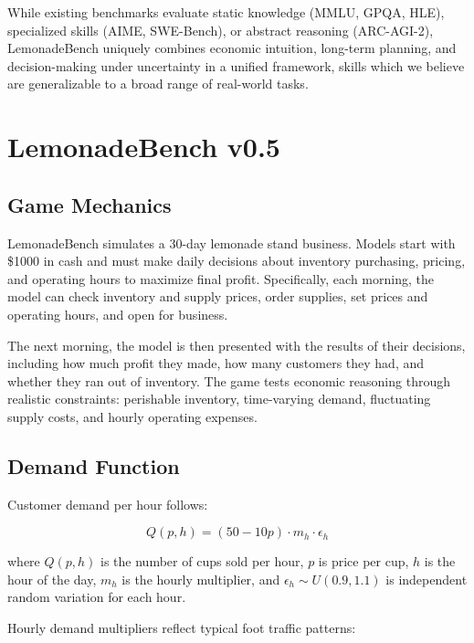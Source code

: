 \documentclass[11pt]{article}
\begin{document}
While existing benchmarks evaluate static knowledge (MMLU, GPQA, HLE), specialized skills (AIME, SWE-Bench), or abstract reasoning (ARC-AGI-2), LemonadeBench uniquely combines economic intuition, long-term planning, and decision-making under uncertainty in a unified framework, skills which we believe are generalizable to a broad range of real-world tasks.

\section{LemonadeBench v0.5}
\label{sec:lemonadebench}

\subsection{Game Mechanics}

LemonadeBench simulates a 30-day lemonade stand business.
Models start with \$1000 in cash and must make daily decisions about inventory purchasing, pricing, and operating hours to maximize final profit.
Specifically, each morning, the model can check inventory and supply prices, order supplies, set prices and operating hours, and open for business.

The next morning, the model is then presented with the results of their decisions, including how much profit they made, how many customers they had, and whether they ran out of inventory.
The game tests economic reasoning through realistic constraints: perishable inventory, time-varying demand, fluctuating supply costs, and hourly operating expenses.

\subsection{Demand Function}

Customer demand per hour follows:

\begin{equation}
Q(p, h) = (50 - 10p) \cdot m_h \cdot \epsilon_h
\end{equation}

where $Q(p, h)$ is the number of cups sold per hour, $p$ is price per cup, $h$ is the hour of the day, $m_h$ is the hourly multiplier, and $\epsilon_h \sim U(0.9, 1.1)$ is independent random variation for each hour.

Hourly demand multipliers reflect typical foot traffic patterns:
\end{document}
